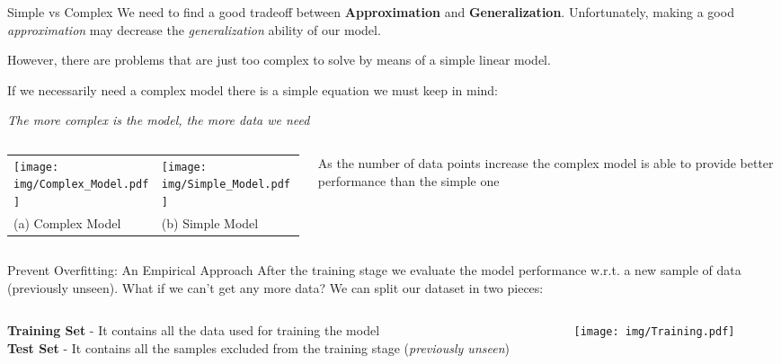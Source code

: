 \documentclass{beamer}
\begin{document}
\begin{frame}{Simple vs Complex}
\small
We need to find a good tradeoff between \textbf{Approximation} and
\textbf{Generalization}.
Unfortunately, making a good \textit{approximation} may decrease the 
\textit{generalization} ability of our model.

However, there are problems that are just too complex to solve
by means of a simple linear model. 

If we necessarily need a complex model there is a simple equation we must keep
in mind:
\begin{center}
\textit{The more complex is the model, the more data we need}
\end{center}
\begin{columns}
\begin{column}{0.8\textwidth}
\begin{tabular}{ll}
\texttt{[image: img/Complex\_Model.pdf]} & \texttt{[image: img/Simple\_Model.pdf]} \\
(a) Complex Model & (b) Simple Model 
\end{tabular}
\end{column}
\begin{column}{0.3\textwidth}
As the number of data points increase the complex model is able to provide
better performance than the simple one  
\end{column}
\end{columns}
\end{frame}

\begin{frame}{Prevent Overfitting: An Empirical Approach}
After the training stage we evaluate the model performance w.r.t.
a new sample of data (previously unseen).
\vskip 0.1cm
What if we can't get any more data? We can split our dataset in two
pieces:
\vskip 0.2cm
\begin{columns}
\begin{column}{0.3\textwidth}
\textbf{Training Set} - It contains all the data
used for training the model \\[2pt]
\textbf{Test Set} - It contains all the samples excluded
from the training stage (\textit{previously unseen})

\end{column}
\begin{column}{0.6\textwidth}
\texttt{[image: img/Training.pdf]}
\end{column}
\end{columns}
\end{frame}
\end{document}
